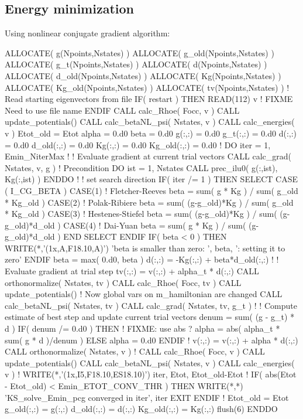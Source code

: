 \subsection{Energy minimization}

Using nonlinear conjugate gradient algorithm:

\begin{fortrancode}
ALLOCATE( g(Npoints,Nstates) )
ALLOCATE( g_old(Npoints,Nstates) )
ALLOCATE( g_t(Npoints,Nstates) )
ALLOCATE( d(Npoints,Nstates) )
ALLOCATE( d_old(Npoints,Nstates) )
ALLOCATE( Kg(Npoints,Nstates) )
ALLOCATE( Kg_old(Npoints,Nstates) )
ALLOCATE( tv(Npoints,Nstates) )
! Read starting eigenvectors from file
IF( restart ) THEN
  READ(112) v   ! FIXME Need to use file name
ENDIF
CALL calc_Rhoe( Focc, v )
CALL update_potentials()
CALL calc_betaNL_psi( Nstates, v )
CALL calc_energies( v )
Etot_old = Etot
alpha = 0.d0
beta  = 0.d0
g(:,:)     = 0.d0
g_t(:,:)   = 0.d0
d(:,:)     = 0.d0
d_old(:,:) = 0.d0
Kg(:,:)    = 0.d0
Kg_old(:,:) = 0.d0
!
DO iter = 1, Emin_NiterMax
  !
  ! Evaluate gradient at current trial vectors
  CALL calc_grad( Nstates, v, g )
  ! Precondition
  DO ist = 1, Nstates
    CALL prec_ilu0( g(:,ist), Kg(:,ist) )
  ENDDO
  !
  ! set search direction
  IF( iter /= 1 ) THEN
    SELECT CASE ( I_CG_BETA )
    CASE(1)
      ! Fletcher-Reeves
      beta = sum( g * Kg ) / sum( g_old * Kg_old )
    CASE(2)
      ! Polak-Ribiere
      beta = sum( (g-g_old)*Kg ) / sum( g_old * Kg_old )
    CASE(3)
      ! Hestenes-Stiefel
      beta = sum( (g-g_old)*Kg ) / sum( (g-g_old)*d_old )
    CASE(4)
      ! Dai-Yuan
      beta = sum( g * Kg ) / sum( (g-g_old)*d_old )
    END SELECT 
  ENDIF
  IF( beta < 0 ) THEN 
    WRITE(*,'(1x,A,F18.10,A)') 'beta is smaller than zero: ', beta, ': setting it to zero'
  ENDIF 
  beta = max( 0.d0, beta )
  d(:,:) = -Kg(:,:) + beta*d_old(:,:)
  !
  ! Evaluate gradient at trial step
  tv(:,:) = v(:,:) + alpha_t * d(:,:)
  CALL orthonormalize( Nstates, tv )
  CALL calc_Rhoe( Focc, tv )
  CALL update_potentials()  ! Now global vars on m_hamiltonian are changed
  CALL calc_betaNL_psi( Nstates, tv )
  CALL calc_grad( Nstates, tv, g_t )
  !
  ! Compute estimate of best step and update current trial vectors
  denum = sum( (g - g_t) * d )
  IF( denum /= 0.d0 ) THEN  ! FIXME: use abs ?
    alpha = abs( alpha_t * sum( g * d )/denum )
  ELSE 
    alpha = 0.d0
  ENDIF
  !
  v(:,:) = v(:,:) + alpha * d(:,:)
  CALL orthonormalize( Nstates, v )
  !
  CALL calc_Rhoe( Focc, v )
  CALL update_potentials()
  CALL calc_betaNL_psi( Nstates, v )
  CALL calc_energies( v )
  !
  WRITE(*,'(1x,I5,F18.10,ES18.10)') iter, Etot, Etot_old-Etot
  !
  IF( abs(Etot - Etot_old) < Emin_ETOT_CONV_THR ) THEN
    WRITE(*,*) 'KS_solve_Emin_pcg converged in iter', iter
    EXIT
  ENDIF
  !
  Etot_old = Etot
  g_old(:,:) = g(:,:)
  d_old(:,:) = d(:,:)
  Kg_old(:,:) = Kg(:,:)
  flush(6)
ENDDO
\end{fortrancode}

